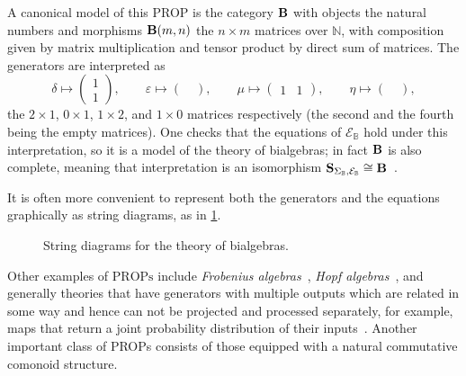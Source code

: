 \begin{example}
A canonical model of this PROP is the category $\mathbf{B}$ with objects
the natural numbers and morphisms $\mathbf{B}(m,n)$ the $n \times m$
matrices over $\mathbb{N}$, with composition given by matrix
multiplication and tensor product by direct sum of matrices. The
generators are interpreted as
\[
\delta \mapsto \begin{pmatrix}1\\1\end{pmatrix},
\qquad
\varepsilon \mapsto \begin{pmatrix}\;\end{pmatrix},
\qquad
\mu \mapsto \begin{pmatrix}1 & 1\end{pmatrix},
\qquad
\eta \mapsto \begin{pmatrix}\;\end{pmatrix},
\]
the $2\times 1$, $0 \times 1$, $1 \times 2$, and $1 \times 0$ matrices
respectively (the second and the fourth being the empty matrices). One checks that
the equations of $\mathcal{E}_{\mathbb{B}}$ hold under this
interpretation, so it is a model of the theory of bialgebras; in fact
$\mathbf{B}$ is also complete, meaning that interpretation is an isomorphism $\mathbf{S}_{\Sigma_{\mathbb{B}},
\mathcal{E}_{\mathbb{B}}} \cong \mathbf{B}$~\cite{lackDedicatedAurelioCarboni}.

It is often more convenient to represent both the generators and the
equations graphically as string diagrams, as in
\cref{fig:bialgebra_generators_equations}.
\end{example}

\begin{figure}
\begin{subfigure}{\textwidth}
    \centering
\end{subfigure}
\begin{subfigure}{\textwidth}
    \centering
\end{subfigure}
\caption{String diagrams for the theory of bialgebras.}
\label{fig:bialgebra_generators_equations}
\end{figure}

Other examples of $\mathrm{PROPs}$ include \emph{Frobenius algebras}~\cite{kockFrobeniusAlgebras2D2003}, \emph{Hopf algebras}~\cite{bonchiInteractingHopfAlgebras2017}, and generally theories that have generators with multiple outputs which are related in some way and hence can not be projected and processed separately, for example, maps that return a joint probability distribution of their inputs~\cite{MarkovProp}.
Another important class of PROPs consists of those equipped with a natural commutative comonoid structure.

